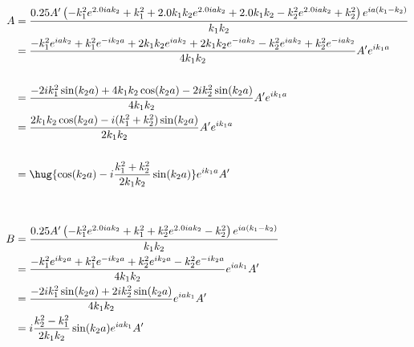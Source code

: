 \documentclass[ex,minted]{exercise_4.0}
\begin{document}
\begin{align*}
    A &= \frac{0.25 A' \left(- k_{1}^{2} e^{2.0 i a k_{2}} + k_{1}^{2} + 2.0 k_{1} k_{2} e^{2.0 i a k_{2}} + 2.0 k_{1} k_{2} - k_{2}^{2} e^{2.0 i a k_{2}} + k_{2}^{2}\right) e^{i a \left(k_{1} - k_{2}\right)}}{k_{1} k_{2}} \\
    &= \frac{- k_{1}^{2} e^{i a k_{2}} + k_{1}^{2} e^{-i k_{2} a} + 2 k_{1} k_{2} e^{i a k_2} + 2 k_{1} k_{2} e^{-i a k_2} - k_{2}^{2} e^{i a k_{2}} + k_2^2 e^{-i a k_2}}{4 k_{1} k_{2}} A' e^{i k_{1} a}\\
    \\
    &= \frac{- 2 i k_1^2 \sin(k_2 a) + 4 k_1 k_2 \cos(k_2 a)  - 2 i k_2^2  \sin(k_2 a)}{4 k_{1} k_{2}} A' e^{i k_{1} a}\\
    &= \frac{2 k_1 k_2 \cos(k_2 a)  - i (k_1^2 + k_2^2)  \sin(k_2 a)}{2 k_{1} k_{2}} A' e^{i k_{1} a}\\
    \\
    &= \hug{\cos(k_2 a)  - i \frac{k_1^2 + k_2^2}{2 k_1 k_2}  \sin(k_2 a)} e^{i k_{1} a} A'\\
    \\
    \\
    B &= \frac{0.25 A' \left(- k_{1}^{2} e^{2.0 i a k_{2}} + k_{1}^{2} + k_{2}^{2} e^{2.0 i a k_{2}} - k_{2}^{2}\right) e^{i a \left(k_{1} - k_{2}\right)}}{k_{1} k_{2}}\\
    &= \frac{- k_1^2 e^{i k_2 a} + k_1^2 e^{-i k_2 a}+ k_2^2 e^{i k_2 a} - k_2^2 e^{-i k_2 a} }{4 k_1 k_2} e^{i a k_1} A'\\
    &= \frac{- 2 i k_1^2 \sin(k_2 a) + 2 i k_2^2 \sin(k_2 a) }{4 k_1 k_2} e^{i a k_1} A'\\
    &= i\frac{k_2^2-k_1^2}{2 k_1 k_2} \sin(k_2 a) e^{i a k_1} A'\\
\end{align*}
\end{document}
